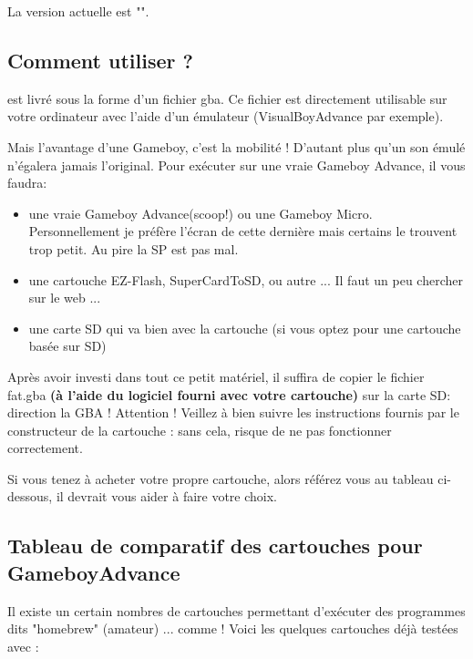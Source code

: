 \documentclass[12pt,a4paper]{article}
\begin{document}
    La version actuelle est "\fatversion".
    
    \subsection{Comment utiliser \FAT ?}

    \FAT est livré sous la forme d'un fichier gba.
    Ce fichier est directement utilisable sur votre ordinateur avec l'aide d'un émulateur (VisualBoyAdvance par exemple).
    \medskip
    
    Mais l'avantage d'une Gameboy, c'est la mobilité !
    D'autant plus qu'un son émulé n'égalera jamais l'original.
    Pour exécuter \FAT sur une vraie Gameboy Advance, il vous faudra:
    \begin{itemize}
        \item{une vraie Gameboy Advance(scoop!) ou une Gameboy Micro. Personnellement je préfère l'écran de cette dernière mais certains le trouvent trop petit. Au pire la SP est pas mal.}
        \item{une cartouche EZ-Flash, SuperCardToSD, ou autre ... Il faut un peu chercher sur le web ...}
        \item{une carte SD qui va bien avec la cartouche (si vous optez pour une cartouche basée sur SD)} 
    \end{itemize}\medskip
    
    Après avoir investi dans tout ce petit matériel, il suffira de copier le fichier fat.gba {\bf (à l'aide du logiciel fourni avec votre cartouche)} sur la carte SD: direction la GBA !
    Attention ! Veillez à bien suivre les instructions fournis par le constructeur de la cartouche : sans cela, \FAT risque de ne pas fonctionner correctement.
    
    
    Si vous tenez à acheter votre propre cartouche, alors référez vous au tableau ci-dessous, il devrait vous aider à faire votre choix.
    
    \subsection{Tableau de comparatif des cartouches pour GameboyAdvance}
    
    Il existe un certain nombres de cartouches permettant d'exécuter des programmes dits "homebrew" (amateur) ... comme \FAT !
    Voici les quelques cartouches déjà testées avec \FAT :
    \medskip
\end{document}
